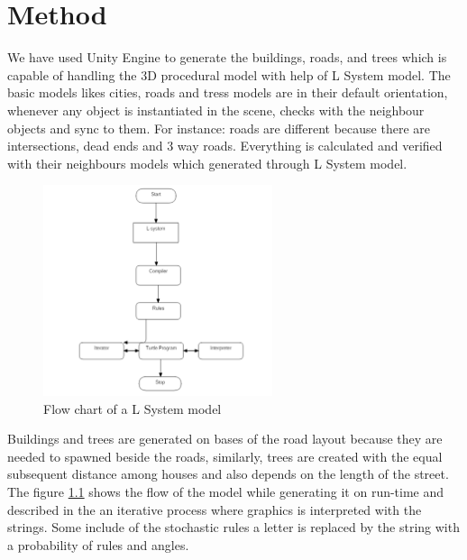 \chapter{Method}

\Large We have used Unity Engine to generate the buildings, roads, and trees which is capable of handling the 3D procedural model with help of L System model. The basic models likes cities, roads and tress models are in their default orientation, whenever any object is instantiated in the scene, checks with the neighbour objects and sync to them. For instance: roads are different because there are intersections, dead ends and 3 way roads. Everything is calculated and verified with their neighbours models which generated through L System model\cite{abrahamcity}.

\vspace{0.5cm}


\begin{figure} %
    \caption{Flow chart of a L System model}
    \label{fig:flowchart}
    \centering
    \includegraphics[width=0.6\textwidth]{3. method/Lsystem Flow Chart.png}
\end{figure}

\Large Buildings and trees are generated on bases of the road layout because they are needed to spawned beside the roads, similarly, trees are created with the equal subsequent distance among houses and also depends on the length of the street. The figure \ref{fig:flowchart} shows the flow of the model while generating it on run-time and described in the \cite{abrahamcity} an iterative process where graphics is interpreted with the strings. Some include of the stochastic rules a letter is replaced by the string with a probability of rules and angles.   




